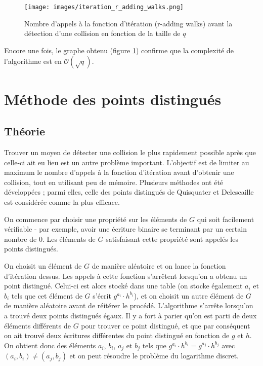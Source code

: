       \begin{figure}
        \center{}
        \texttt{[image: images/iteration\_r\_adding\_walks.png]}
        \caption{Nombre d'appels à la fonction d'itération (r-adding walks) avant la détection d'une collision en fonction de la taille de $q$}
        \label{fig:r_adding_walks_iteration_results}
      \end{figure}

      Encore une fois, le graphe obtenu (figure \ref{fig:r_adding_walks_iteration_results}) confirme que la complexité de l'algorithme est en $\mathcal{O}(\sqrt{q})$.


    \section{Méthode des points distingués}
      \subsection{Théorie}
      Trouver un moyen de détecter une collision le plus rapidement possible après que celle-ci ait eu lieu est un autre problème important.  L'objectif est de limiter au maximum le nombre d'appels à la fonction d'itération avant d'obtenir une collision, tout en utilisant peu de mémoire. Plusieurs méthodes ont été développées ; parmi elles, celle des points distingués de Quisquater et Delescaille~\autocite[4]{pollard1} est considérée comme la plus efficace.

      On commence par choisir une propriété sur les éléments de $G$ qui soit facilement vérifiable - par exemple, avoir une écriture binaire se terminant par un certain nombre de $0$. Les éléments de $G$ satisfaisant cette propriété sont appelés les points distingués.

      On choisit un élément de $G$ de manière aléatoire et on lance la fonction d'itération dessus. Les appels à cette fonction s'arrêtent lorsqu'on a obtenu un point distingué. Celui-ci est alors stocké dans une table (on stocke également $a_i$ et $b_i$ tels que cet élément de $G$ s'écrit $g^{a_i} \cdot h^{b_i}$), et on choisit un autre élément de $G$ de manière aléatoire avant de réitérer le procédé. L'algorithme s'arrête lorsqu'on a trouvé deux points distingués égaux. Il y a fort à parier qu'on est parti de deux éléments différents de $G$ pour trouver ce point distingué, et que par conséquent on ait trouvé deux écritures différentes du point distingué en fonction de $g$ et $h$. On obtient donc des éléments $a_i$, $b_i$, $a_j$ et $b_j$ tels que $g^{a_i} \cdot h^{b_i} = g^{a_j} \cdot h^{b_j}$ avec $(a_i,b_i) \neq (a_j,b_j)$ et on peut résoudre le problème du logarithme discret.

